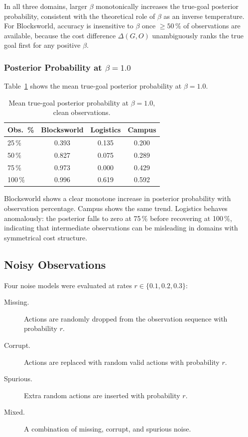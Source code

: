 \documentclass[11pt,a4paper]{article}
\begin{document}
In all three domains, larger $\beta$ monotonically increases the
true-goal posterior probability, consistent with the theoretical role
of $\beta$ as an inverse temperature.  For Blocksworld, accuracy is
insensitive to $\beta$ once $\geq 50\,\%$ of observations are
available, because the cost difference $\Delta(G,O)$ unambiguously
ranks the true goal first for any positive $\beta$.

\subsubsection{Posterior Probability at $\beta = 1.0$}

Table~\ref{tab:clean_prob} shows the mean true-goal posterior probability
at $\beta = 1.0$.

\begin{table}[H]
\centering
\caption{Mean true-goal posterior probability at $\beta = 1.0$, clean observations.}
\label{tab:clean_prob}
\begin{tabular}{lccc}
\toprule
\textbf{Obs.\ \%} & \textbf{Blocksworld} & \textbf{Logistics} & \textbf{Campus} \\
\midrule
25\,\%  & 0.393 & 0.135 & 0.200 \\
50\,\%  & 0.827 & 0.075 & 0.289 \\
75\,\%  & 0.973 & 0.000 & 0.429 \\
100\,\% & 0.996 & 0.619 & 0.592 \\
\bottomrule
\end{tabular}
\end{table}

Blocksworld shows a clear monotone increase in posterior probability
with observation percentage.  Campus shows the same trend.  Logistics
behaves anomalously: the posterior falls to zero at 75\,\% before
recovering at 100\,\%, indicating that intermediate observations can be
misleading in domains with symmetrical cost structure.

\subsection{Noisy Observations}

Four noise models were evaluated at rates $r \in \{0.1, 0.2, 0.3\}$:

\begin{description}
  \item[Missing.] Actions are randomly dropped from the observation
    sequence with probability $r$.
  \item[Corrupt.] Actions are replaced with random valid actions with
    probability $r$.
  \item[Spurious.] Extra random actions are inserted with probability $r$.
  \item[Mixed.] A combination of missing, corrupt, and spurious noise.
\end{description}
\end{document}
